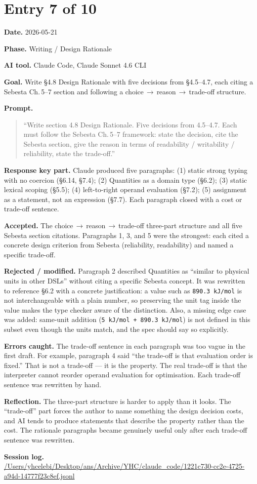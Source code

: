 \documentclass[11pt,a4paper]{article}
\newcommand{\code}[1]{\texttt{#1}}
\newcommand{\field}[2]{\textbf{#1.} #2\par}
\newcommand{\prompt}[1]{%
  \textbf{Prompt.}
  \begin{quote}\small #1\end{quote}
}
\newcommand{\sessionlog}[1]{\textbf{Session log.} \url{#1}\par}
\begin{document}
\section{Entry 7 of 10}
\field{Date}{2026-05-21}
\field{Phase}{Writing / Design Rationale}
\field{AI tool}{Claude Code, Claude Sonnet 4.6 CLI}
\field{Goal}{Write \S4.8 Design Rationale with five decisions from \S4.5--4.7, each citing a Sebesta Ch.\,5--7 section and following a choice\,$\to$\,reason\,$\to$\,trade-off structure.}
\prompt{``Write section 4.8 Design Rationale. Five decisions from 4.5--4.7. Each must follow the Sebesta Ch.\,5--7 framework: state the decision, cite the Sebesta section, give the reason in terms of readability / writability / reliability, state the trade-off.''}
\field{Response key part}{Claude produced five paragraphs: (1) static strong typing with no coercion (\S6.14, \S7.4); (2) Quantities as a domain type (\S6.2); (3) static lexical scoping (\S5.5); (4) left-to-right operand evaluation (\S7.2); (5) assignment as a statement, not an expression (\S7.7). Each paragraph closed with a cost or trade-off sentence.}
\field{Accepted}{The choice\,$\to$\,reason\,$\to$\,trade-off three-part structure and all five Sebesta section citations. Paragraphs 1, 3, and 5 were the strongest: each cited a concrete design criterion from Sebesta (reliability, readability) and named a specific trade-off.}
\field{Rejected / modified}{Paragraph 2 described Quantities as ``similar to physical units in other DSLs'' without citing a specific Sebesta concept. It was rewritten to reference \S6.2 with a concrete justification: a value such as \code{890.3 kJ/mol} is not interchangeable with a plain number, so preserving the unit tag inside the value makes the type checker aware of the distinction. Also, a missing edge case was added: same-unit addition (\code{5 kJ/mol + 890.3 kJ/mol}) is not defined in this subset even though the units match, and the spec should say so explicitly.}
\field{Errors caught}{The trade-off sentence in each paragraph was too vague in the first draft. For example, paragraph 4 said ``the trade-off is that evaluation order is fixed.'' That is not a trade-off --- it is the property. The real trade-off is that the interpreter cannot reorder operand evaluation for optimisation. Each trade-off sentence was rewritten by hand.}
\field{Reflection}{The three-part structure is harder to apply than it looks. The ``trade-off'' part forces the author to name something the design decision costs, and AI tends to produce statements that describe the property rather than the cost. The rationale paragraphs became genuinely useful only after each trade-off sentence was rewritten.}
\sessionlog{/Users/yhcelebi/Desktop/ans/Archive/YHC/claude_code/1221c730-cc2e-4725-a94d-14777f23c8ef.jsonl}
\end{document}
